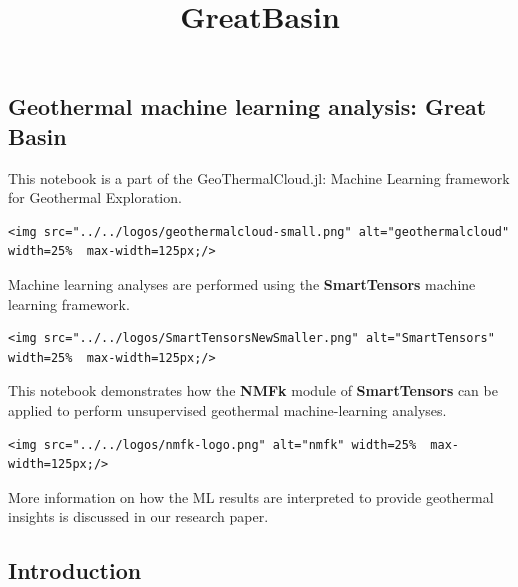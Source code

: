 \documentclass[11pt]{article}
\title{GreatBasin}
\begin{document}
    
    \maketitle
    
    

    
    \hypertarget{geothermal-machine-learning-analysis-great-basin}{%
\subsection{Geothermal machine learning analysis: Great
Basin}\label{geothermal-machine-learning-analysis-great-basin}}

This notebook is a part of the GeoThermalCloud.jl: Machine Learning
framework for Geothermal Exploration.

\begin{verbatim}
<img src="../../logos/geothermalcloud-small.png" alt="geothermalcloud" width=25%  max-width=125px;/>
\end{verbatim}

Machine learning analyses are performed using the \textbf{SmartTensors}
machine learning framework.

\begin{verbatim}
<img src="../../logos/SmartTensorsNewSmaller.png" alt="SmartTensors" width=25%  max-width=125px;/>
\end{verbatim}

This notebook demonstrates how the \textbf{NMFk} module of
\textbf{SmartTensors} can be applied to perform unsupervised geothermal
machine-learning analyses.

\begin{verbatim}
<img src="../../logos/nmfk-logo.png" alt="nmfk" width=25%  max-width=125px;/>
\end{verbatim}

More information on how the ML results are interpreted to provide
geothermal insights is discussed in our research paper.

    \hypertarget{introduction}{%
\subsection{Introduction}\label{introduction}}
\end{document}
